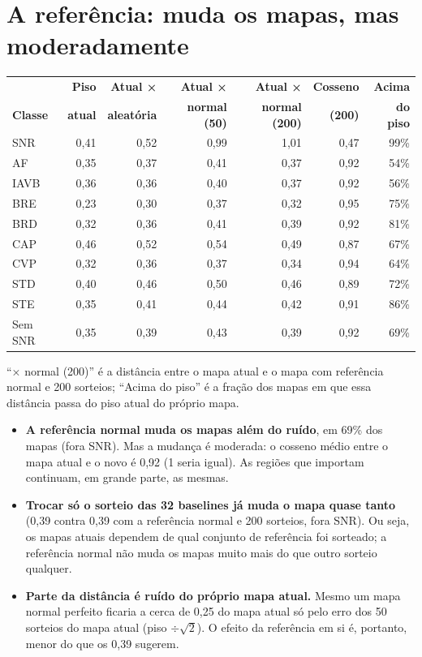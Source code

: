 \documentclass[11pt,a4paper]{article}
\begin{document}
\section{A referência: muda os mapas, mas moderadamente}
\begin{center}\small
\setlength{\tabcolsep}{4pt}
\begin{tabular}{lrrrrrr}
\toprule
& \textbf{Piso} & \textbf{Atual ×} & \textbf{Atual ×} & \textbf{Atual ×} & \textbf{Cosseno} & \textbf{Acima} \\
\textbf{Classe} & \textbf{atual} & \textbf{aleatória} & \textbf{normal (50)} & \textbf{normal (200)} & \textbf{(200)} & \textbf{do piso} \\
\midrule
SNR  & 0,41 & 0,52 & 0,99 & 1,01 & 0,47 & 99\% \\
AF   & 0,35 & 0,37 & 0,41 & 0,37 & 0,92 & 54\% \\
IAVB & 0,36 & 0,36 & 0,40 & 0,37 & 0,92 & 56\% \\
BRE  & 0,23 & 0,30 & 0,37 & 0,32 & 0,95 & 75\% \\
BRD  & 0,32 & 0,36 & 0,41 & 0,39 & 0,92 & 81\% \\
CAP  & 0,46 & 0,52 & 0,54 & 0,49 & 0,87 & 67\% \\
CVP  & 0,32 & 0,36 & 0,37 & 0,34 & 0,94 & 64\% \\
STD  & 0,40 & 0,46 & 0,50 & 0,46 & 0,89 & 72\% \\
STE  & 0,35 & 0,41 & 0,44 & 0,42 & 0,91 & 86\% \\
\midrule
Sem SNR & 0,35 & 0,39 & 0,43 & 0,39 & 0,92 & 69\% \\
\bottomrule
\end{tabular}
\end{center}
“× normal (200)” é a distância entre o mapa atual e o mapa com referência normal e 200 sorteios; “Acima do piso” é a fração dos mapas em que essa distância passa do piso atual do próprio mapa.

\begin{itemize}
\item \textbf{A referência normal muda os mapas além do ruído}, em 69\% dos mapas (fora SNR). Mas a mudança é moderada: o cosseno médio entre o mapa atual e o novo é 0,92 (1 seria igual). As regiões que importam continuam, em grande parte, as mesmas.
\item \textbf{Trocar só o sorteio das 32 baselines já muda o mapa quase tanto} (0,39 contra 0,39 com a referência normal e 200 sorteios, fora SNR). Ou seja, os mapas atuais dependem de qual conjunto de referência foi sorteado; a referência normal não muda os mapas muito mais do que outro sorteio qualquer.
\item \textbf{Parte da distância é ruído do próprio mapa atual.} Mesmo um mapa normal perfeito ficaria a cerca de 0,25 do mapa atual só pelo erro dos 50 sorteios do mapa atual (piso $\div \sqrt{2}$). O efeito da referência em si é, portanto, menor do que os 0,39 sugerem.
\end{itemize}
\end{document}
